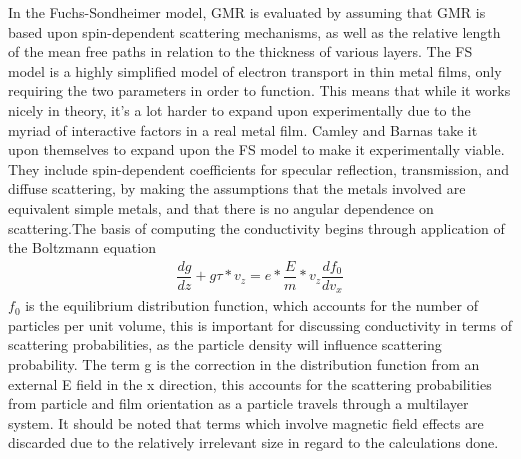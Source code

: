\documentclass[11pt]{article}
\begin{document}
\begin{multicols}{2}
In the Fuchs-Sondheimer model, GMR is evaluated by assuming that GMR is based upon spin-dependent scattering mechanisms, as well as the relative length of the mean free paths in relation to the thickness of various layers. The FS model is a highly simplified model of electron transport in thin metal films, only requiring the two parameters in order to function. This means that while it works nicely in theory, it’s a lot harder to expand upon experimentally due to the myriad of interactive factors in a real metal film. Camley and Barnas take it upon themselves to expand upon the FS model to make it experimentally viable. They include spin-dependent coefficients for specular reflection, transmission, and diffuse scattering, by making the assumptions that the metals involved are equivalent simple metals, and that there is no angular dependence on scattering.The basis of computing the conductivity begins through application of the Boltzmann equation
\begin{align*}
\dfrac{dg}{dz}+ g τ*v_z = e*\dfrac{E}{m}*v_z \dfrac{df_0}{dv_x}
\end{align*}
$f_0$ is the equilibrium distribution function, which accounts for the number of particles per unit volume, this is important for discussing conductivity in terms of scattering probabilities, as the particle density will influence scattering probability. The term g is the correction in the distribution function from an external E field in the x direction, this accounts for the scattering probabilities from particle and film orientation as a particle travels through a multilayer system. It should be noted that terms which involve magnetic field effects are discarded due to the relatively irrelevant size in regard to the calculations done\textsubscript{\cite{label2}}. 


\end{multicols}
\end{document}
